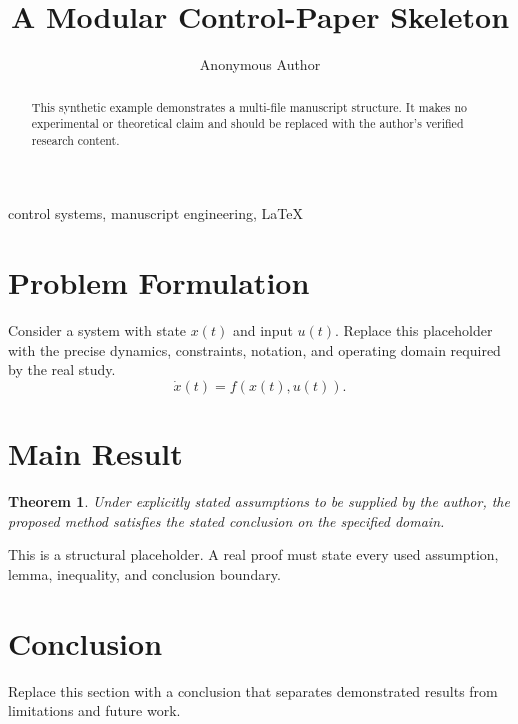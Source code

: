 \documentclass[journal]{IEEEtran}
\title{A Modular Control-Paper Skeleton}
\author{Anonymous Author}
\newtheorem{theorem}{Theorem}
\begin{document}
\maketitle

\begin{abstract}
This synthetic example demonstrates a multi-file manuscript structure. It makes no experimental or theoretical claim and should be replaced with the author's verified research content.
\end{abstract}

\begin{IEEEkeywords}
control systems, manuscript engineering, LaTeX
\end{IEEEkeywords}



\section{Problem Formulation}
Consider a system with state $x(t)$ and input $u(t)$. Replace this placeholder with the precise dynamics, constraints, notation, and operating domain required by the real study.
\begin{equation}
  \dot{x}(t) = f(x(t),u(t)).
  \label{eq:system}
\end{equation}

\section{Main Result}
\begin{theorem}
Under explicitly stated assumptions to be supplied by the author, the proposed method satisfies the stated conclusion on the specified domain.
\end{theorem}
\begin{IEEEproof}
This is a structural placeholder. A real proof must state every used assumption, lemma, inequality, and conclusion boundary.
\end{IEEEproof}

\section{Conclusion}
Replace this section with a conclusion that separates demonstrated results from limitations and future work.



\end{document}
